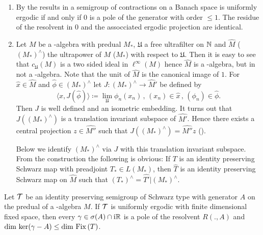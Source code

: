 \begin{remarks}\label{rem:d3-2.4}
\begin{enumerate}[\upshape (i), wide, labelindent=.5em]
\item
By the results in \citet{lin:1974} a semigroup of contractions on a Banach space is uniformly ergodic if and only if $0$ is a pole of the generator with order $\leq 1$.
The residue of the resolvent in $0$ and the assocciated ergodic projection are identical.

\item
Let $M$ be a \WA-algebra with predual $M_{*}$, $\mathfrak{U}$ a free ultrafilter on $\mathbb{N} $ and $\widehat{M}$ (\resp  $(M_{*})^{\wedge}$) the ultrapower of $M$ (\resp  $M_{*}$) with respect to $\mathfrak{U}$.
Then it is easy to see that $c_{\mathfrak{U}}(M)$ is a two sided ideal in $\ell^{\infty}(M)$ hence $\widehat{M}$ is a \CA-algebra, but in not a \WA-algebra.
Note that the unit of $\widehat{M}$ is the canonical image of $1$.
For $\hat{x} \in \hat{M}$ and $\hat{\phi} \in (M_{*})^{\wedge}$ let $J: (M_{*})^{\wedge} \to \widehat{M}'$ be defined by
\[
\langle x,J(\hat{\phi}) \rangle \coloneqq \lim_{\mathfrak{U}}\phi_{n}(x_{n}) \, , \, (x_{n}) \in \hat{x} \, , \, (\phi_{n}) \in \hat{\phi} .
\]
Then $J$ is well defined and an isometric embedding.
It turns out that $J((M_{*})^{\wedge})$ is a translation invariant subspace of $\widehat{M'}$.
Hence there exists a central projection $z \in \widehat{M''}$ such that $J((M_{*})^{\wedge}) = \widehat{M''}z$ (\citet[Proposition 2.2]{groh:1984b}).

Below we identify $(M_{*})^{\wedge}$ via $J$ with this translation invariant subspace.
From the construction the following is obvious: If $T$ is an identity preserving Schwarz map with preadjoint $T_{*} \in L(M_{*})$, then $\widehat{T}$ is an identity preserving Schwarz map on $\widehat{M}$ such that $(T_{*})^{\wedge} = \widehat{T'}|(M_{*})^{\wedge}$.
\end{enumerate}
\end{remarks}
\begin{theorem}\label{thm:d3-2.5}
Let $\mathcal{T}$ be an identity preserving semigroup of Schwarz type with generator $A$ on the predual of a \WA-algebra $M$.
If $\mathcal{T}$ is uniformly ergodic with finite dimensional fixed space, then every $\gamma \in \sigma(A) \cap \mathrm{i}\mathbb{R}$ is a pole of the resolvent $R(.,A)$ and $\dim \mathop{}\mathrm{ker}(\gamma - A) \leq \dim \mathop{}\mathrm{Fix}\left(T\right)$.
\end{theorem}
